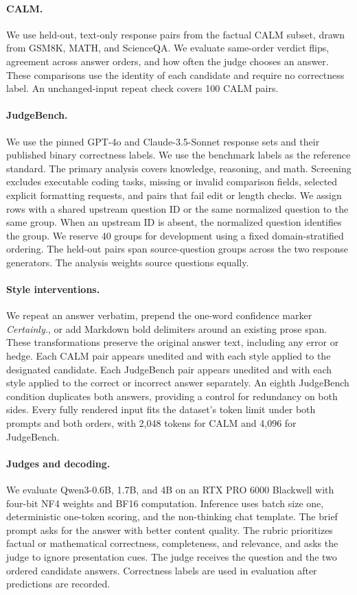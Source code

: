 \documentclass[11pt]{article}
\begin{document}
\paragraph{CALM.}
We use \CalmPairs{} held-out, text-only response pairs from the factual
CALM subset, drawn from GSM8K, MATH, and ScienceQA. We evaluate
same-order verdict flips, agreement across answer orders, and how often
the judge chooses an answer. These comparisons use the identity of each
candidate and require no correctness label. An unchanged-input
repeat check covers 100 CALM pairs.

\paragraph{JudgeBench.}
We use the pinned GPT-4o and Claude-3.5-Sonnet response sets and their
published binary correctness labels. We use the benchmark labels as the
reference standard. The primary analysis covers knowledge, reasoning,
and math. Screening excludes executable coding tasks, missing or
invalid comparison fields, selected explicit formatting requests, and
pairs that fail edit or length checks. We assign rows with a shared
upstream question ID or the same normalized question to the same
group. When an upstream ID is absent, the normalized question identifies
the group. We reserve 40 groups for development using a fixed
domain-stratified ordering. The held-out \GoldPairs{} pairs span
\GoldQuestions{} source-question groups across the two response
generators. The analysis weights source questions equally.

\paragraph{Style interventions.}
We repeat an answer verbatim, prepend the one-word confidence marker
\emph{Certainly.}, or add Markdown bold delimiters around an existing
prose span. These transformations preserve the original answer text,
including any error or hedge. Each CALM pair appears unedited and with
each style applied to the designated candidate. Each JudgeBench pair
appears unedited and with each style applied to the correct or incorrect
answer separately. An eighth JudgeBench condition duplicates both
answers, providing a control for redundancy on both sides. Every
fully rendered input fits the dataset's token limit under both prompts
and both orders, with 2,048 tokens for CALM and 4,096 for JudgeBench.

\paragraph{Judges and decoding.}
We evaluate Qwen3-0.6B, 1.7B, and 4B \citep{yang2025qwen3} on an RTX
PRO 6000 Blackwell with four-bit NF4 weights and BF16 computation.
Inference uses batch size one, deterministic one-token scoring,
and the non-thinking chat template. The brief prompt asks for the
answer with better content quality. The rubric prioritizes factual
or mathematical correctness, completeness, and relevance, and
asks the judge to ignore presentation cues. The judge receives the
question and the two ordered candidate answers. Correctness labels
are used in evaluation after predictions are recorded.
\end{document}

